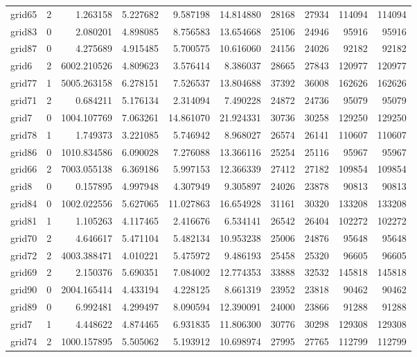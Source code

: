 \begin{longtable}{|l|r|r|r|r|r|r|r|r|r|}
grid65 & 2 & 1.263158 & 5.227682 & 9.587198 & 14.814880 & 28168 & 27934 & 114094 & 114094 \\
grid83 & 0 & 2.080201 & 4.898085 & 8.756583 & 13.654668 & 25106 & 24946 & 95916 & 95916 \\
grid87 & 0 & 4.275689 & 4.915485 & 5.700575 & 10.616060 & 24156 & 24026 & 92182 & 92182 \\
grid6 & 2 & 6002.210526 & 4.809623 & 3.576414 & 8.386037 & 28665 & 27843 & 120977 & 120977 \\
grid77 & 1 & 5005.263158 & 6.278151 & 7.526537 & 13.804688 & 37392 & 36008 & 162626 & 162626 \\
grid71 & 2 & 0.684211 & 5.176134 & 2.314094 & 7.490228 & 24872 & 24736 & 95079 & 95079 \\
grid7 & 0 & 1004.107769 & 7.063261 & 14.861070 & 21.924331 & 30736 & 30258 & 129250 & 129250 \\
grid78 & 1 & 1.749373 & 3.221085 & 5.746942 & 8.968027 & 26574 & 26141 & 110607 & 110607 \\
grid86 & 0 & 1010.834586 & 6.090028 & 7.276088 & 13.366116 & 25254 & 25116 & 95967 & 95967 \\
grid66 & 2 & 7003.055138 & 6.369186 & 5.997153 & 12.366339 & 27412 & 27182 & 109854 & 109854 \\
grid8 & 0 & 0.157895 & 4.997948 & 4.307949 & 9.305897 & 24026 & 23878 & 90813 & 90813 \\
grid84 & 0 & 1002.022556 & 5.627065 & 11.027863 & 16.654928 & 31161 & 30320 & 133208 & 133208 \\
grid81 & 1 & 1.105263 & 4.117465 & 2.416676 & 6.534141 & 26542 & 26404 & 102272 & 102272 \\
grid70 & 2 & 4.646617 & 5.471104 & 5.482134 & 10.953238 & 25006 & 24876 & 95648 & 95648 \\
grid72 & 2 & 4003.388471 & 4.010221 & 5.475972 & 9.486193 & 25458 & 25320 & 96605 & 96605 \\
grid69 & 2 & 2.150376 & 5.690351 & 7.084002 & 12.774353 & 33888 & 32532 & 145818 & 145818 \\
grid90 & 0 & 2004.165414 & 4.433194 & 4.228125 & 8.661319 & 23952 & 23818 & 90462 & 90462 \\
grid89 & 0 & 6.992481 & 4.299497 & 8.090594 & 12.390091 & 24000 & 23866 & 91288 & 91288 \\
grid7 & 1 & 4.448622 & 4.874465 & 6.931835 & 11.806300 & 30776 & 30298 & 129308 & 129308 \\
grid74 & 2 & 1000.157895 & 5.505062 & 5.193912 & 10.698974 & 27995 & 27765 & 112799 & 112799 \\

\end{longtable}
